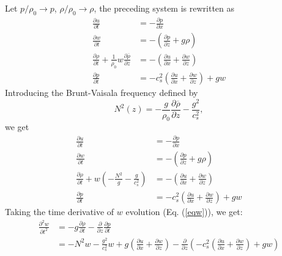 \documentclass[a4paper]{article}
\numberwithin{equation}{section}
\begin{document}
Let $p/\rho_0\rightarrow p$, $\rho/\rho_0 \rightarrow \rho$, the preceding system is rewritten as
\begin{align*}
\frac{\partial u}{\partial t}&=-\frac{\partial p}{\partial x}\\
\frac{\partial w}{\partial t}&=-\left(\frac{\partial p}{\partial z}+g\rho\right)\\
\frac{\partial \rho}{\partial t}+\frac{1}{\rho_0}w\frac{\partial \overline{\rho}}{\partial z}&=-\left(\frac{\partial u}{\partial x}+\frac{\partial w}{\partial z}\right)\\
\frac{\partial p}{\partial t}&=-c_s^2\left(
\displaystyle \frac{\partial u}{\partial x}+\frac{\partial w}{\partial z}
\right)+gw
\end{align*}
Introducing the Brunt-Vaisala frequency defined by
\[
N^2(z)=-\frac{g}{\rho_0}\frac{\partial \overline{\rho}}{\partial z}-\frac{g^2}{c_s^2},
\]
we get
\begin{align}
\frac{\partial u}{\partial t}&=-\frac{\partial p}{\partial x}\label{equ}\\
\frac{\partial w}{\partial t}&=-\left(\frac{\partial p}{\partial z}+g\rho\right)\label{eqw}\\
\frac{\partial \rho}{\partial t}+w\left(
-\frac{N^2}{g}-\frac{g}{c_s^2}
\right)&=-\left(\frac{\partial u}{\partial x}+\frac{\partial w}{\partial z}\right)\\
\frac{\partial p}{\partial t}&=-c_s^2\left(
\displaystyle \frac{\partial u}{\partial x}+\frac{\partial w}{\partial z}
\right)+gw
\end{align}
Taking the time derivative of $w$ evolution (Eq. (\ref{eqw})), we get:
\begin{align*}
\frac{\partial^2 w}{\partial t^2}&=
-g\frac{\partial \rho}{\partial t}
-\frac{\partial}{\partial z}\frac{\partial p}{\partial t}\\
&=-N^2w-\frac{g^2}{c_s^2}w+g\left(
\frac{\partial u}{\partial x}+\frac{\partial w}{\partial z}
\right)
-\frac{\partial}{\partial z}(-c_s^2\left(
\displaystyle \frac{\partial u}{\partial x}+\frac{\partial w}{\partial z}
\right)+gw)
\end{align*}
\end{document}
